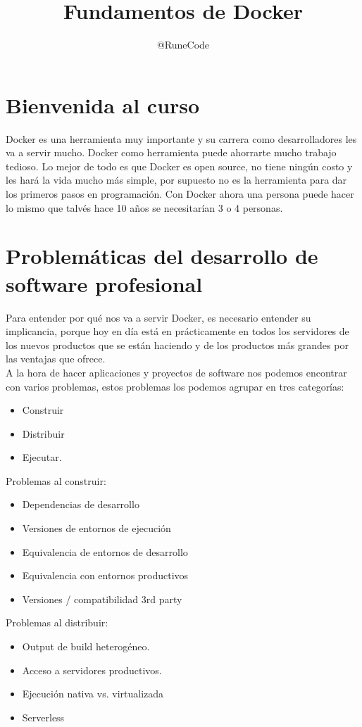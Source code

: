 \documentclass{article}
\title{Fundamentos de Docker}
\author{@RuneCode}
\begin{document}


\section{Bienvenida al curso}%
Docker es una herramienta muy importante y su carrera como desarrolladores les
va a servir mucho. Docker como herramienta puede ahorrarte mucho trabajo
tedioso. Lo mejor de todo es que Docker es open source, no tiene ningún costo y
les hará la vida mucho más simple, por supuesto no es la herramienta para dar
los primeros pasos en programación. Con Docker ahora una persona puede hacer lo
mismo que talvés hace 10 años se necesitarían 3 o 4 personas.

\section{Problemáticas del desarrollo de software profesional}%
Para entender por qué nos va a servir Docker, es necesario entender su
implicancia, porque hoy en día está en prácticamente en todos los servidores de
los nuevos productos que se están haciendo y de los productos más grandes por
las ventajas que ofrece.\\

A la hora de hacer aplicaciones y proyectos de software nos podemos encontrar
con varios problemas, estos problemas los podemos agrupar en tres categorías:\\

\begin{itemize}
  \item Construir
  \item Distribuir
  \item Ejecutar.
\end{itemize}

Problemas al construir:\\
\begin{itemize}
  \item Dependencias de desarrollo
  \item Versiones de entornos de ejecución
  \item Equivalencia de entornos de desarrollo
  \item Equivalencia con entornos productivos
  \item Versiones / compatibilidad 3rd party
\end{itemize}

Problemas al distribuir:\\
\begin{itemize}
  \item Output de build heterogéneo.
  \item Acceso a servidores productivos.
  \item Ejecución nativa vs. virtualizada
  \item Serverless
\end{itemize}
\end{document}
